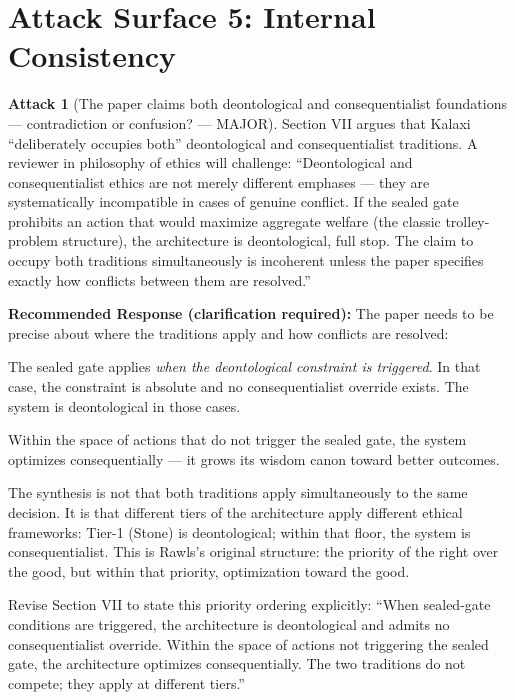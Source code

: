 \documentclass[12pt,a4paper]{article}
\theoremstyle{definition}
\newtheorem{attack}{Attack}[section]
\begin{document}
\section{Attack Surface 5: Internal Consistency}

\begin{attack}[The paper claims both deontological and consequentialist foundations — contradiction or confusion? — MAJOR]
\label{att:ethics}
Section VII argues that Kalaxi ``deliberately occupies both'' deontological and
consequentialist traditions. A reviewer in philosophy of ethics will challenge:
``Deontological and consequentialist ethics are not merely different emphases —
they are systematically incompatible in cases of genuine conflict. If the sealed
gate prohibits an action that would maximize aggregate welfare (the classic
trolley-problem structure), the architecture is deontological, full stop. The
claim to occupy both traditions simultaneously is incoherent unless the paper
specifies exactly how conflicts between them are resolved.''
\end{attack}

\begin{mdframed}[style=defenseframe]
\textbf{Recommended Response (clarification required):}
The paper needs to be precise about where the traditions apply and how conflicts
are resolved:

The sealed gate applies \emph{when the deontological constraint is triggered}.
In that case, the constraint is absolute and no consequentialist override exists.
The system is deontological in those cases.

Within the space of actions that do not trigger the sealed gate, the system
optimizes consequentially — it grows its wisdom canon toward better outcomes.

The synthesis is not that both traditions apply simultaneously to the same
decision. It is that different tiers of the architecture apply different ethical
frameworks: Tier-1 (Stone) is deontological; within that floor, the system is
consequentialist. This is Rawls's original structure: the priority of the right
over the good, but within that priority, optimization toward the good.

Revise Section VII to state this priority ordering explicitly: ``When sealed-gate
conditions are triggered, the architecture is deontological and admits no
consequentialist override. Within the space of actions not triggering the sealed
gate, the architecture optimizes consequentially. The two traditions do not
compete; they apply at different tiers.''
\end{mdframed}
\end{document}
